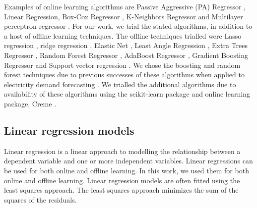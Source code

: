 \documentclass[final,3p,times,twocolumn,numbers]{elsarticle}
\begin{document}



Examples of online learning algorithms are Passive Aggressive (PA) Regressor \cite{Gzik2014}, Linear Regression, Box-Cox Regressor \cite{Box1964}, K-Neighbors Regressor \cite{forgy65} and Multilayer perceptron regressor \cite{Hinton1989}. For our work, we trial the stated algorithms, in addition to a host of offline learning techniques. The offline techniques trialled were Lasso regression \cite{Tibshirani1996a}, ridge regression \cite{GeladiPaul1994Mrac},  Elastic Net \cite{Geostatistics2010}, Least Angle Regression \cite{Fike1988}, Extra Trees Regressor \cite{Fike1988}, Random Forest Regressor \cite{Breiman2001}, AdaBoost Regressor \cite{Freund1997}, Gradient Boosting Regressor \cite{316} and Support vector regression \cite{Cortes1995}. We chose the boosting and random forest techniques due to previous successes of these algorithms when applied to electricity demand forecasting \cite{Kell2018}. We trialled the additional algorithms due to availability of these algorithms using the scikit-learn package and online learning package, Creme \cite{scikit-learn,creme}. %


\subsection{Linear regression models}


Linear regression is a linear approach to modelling the relationship between a dependent variable and one or more independent variables. Linear regressions can be used for both online and offline learning. In this work, we used them for both online and offline learning. Linear regression models are often fitted using the least squares approach. The least squares approach minimizes the sum of the squares of the residuals. 
\end{document}
